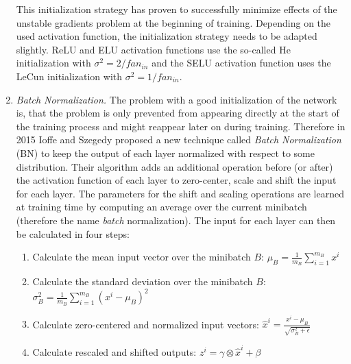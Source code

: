 \begin{enumerate}
  This initialization strategy has proven to successfully minimize effects of the unstable gradients problem at the beginning of training. Depending on the used activation function, the initialization strategy needs to be adapted slightly. ReLU and ELU activation functions use the so-called He initialization with $\sigma^2 = 2 / fan_{in}$ and the SELU activation function uses the LeCun initialization with $\sigma^2 = 1 / fan_{in}$.
  \item \textit{Batch Normalization.} The problem with a good initialization of the network is, that the problem is only prevented from appearing directly at the start of the training process and might reappear later on during training. Therefore in 2015 Ioffe and Szegedy proposed a new technique called \textit{Batch Normalization} (BN) to keep the output of each layer normalized with respect to some distribution. Their algorithm adds an additional operation before (or after) the activation function of each layer to zero-center, scale and shift the input for each layer. The parameters for the shift and scaling operations are learned at training time by computing an average over the current minibatch (therefore the name \textit{batch} normalization). The input for each layer can then be calculated in four steps:


  \begin{enumerate}\setcounter{enumii}{0}\renewcommand\theenumii{\arabic{enumii}}
    \item Calculate the mean input vector over the minibatch $B$: $\displaystyle \mu_B = \frac{1}{m_B} \sum_{i=1}^{m_B} x^i$ 
    \item Calculate the standard deviation over the minibatch $B$: $\displaystyle \sigma_B^2 = \frac{1}{m_B} \sum_{i=1}^{m_B} \left(x^i - \mu_B\right)^2$
    \item Calculate zero-centered and normalized input vectors: $\displaystyle \hat{x}^i = \frac{x^i - \mu_B}{\sqrt{\sigma_B^2 + \epsilon}}$
    \item Calculate rescaled and shifted outputs: $\displaystyle z^i = \gamma \otimes \hat{x}^i + \beta$
  \end{enumerate}
  

\end{enumerate}
